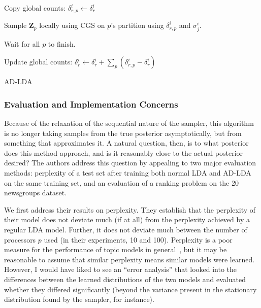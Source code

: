 \documentclass[11pt]{article}
\begin{document}
\begin{algorithm}
  \begin{algorithmic}
    \Repeat

        Copy global counts: $\delta_{r,p}^i \leftarrow \delta_r^i$

        Sample $\mathbf{Z}_p$ locally using CGS on $p$'s partition using
        $\delta_{r,p}^i$ and $\sigma_j^i$.
      \EndFor

      Wait for all $p$ to finish.

      Update global counts: $\delta_r^i \leftarrow \delta_r^i + \sum_p
      (\delta_{r,p}^i - \delta_r^i)$
  \end{algorithmic}
  \caption{AD-LDA}
  \label{alg:adlda}
\end{algorithm}

\subsubsection{Evaluation and Implementation Concerns}

Because of the relaxation of the sequential nature of the sampler, this
algorithm is no longer taking samples from the true posterior
asymptotically, but from something that approximates it. A natural
question, then, is to what posterior does this method approach, and is it
reasonably close to the actual posterior desired? The authors address this
question by appealing to two major evaluation methods: perplexity of a test
set after training both normal LDA and AD-LDA on the same training set, and
an evaluation of a ranking problem on the 20 newsgroups dataset.

We first address their results on perplexity. They establish that the
perplexity of their model does not deviate much (if at all) from the
perplexity achieved by a regular LDA model. Further, it does not deviate
much between the number of processors $p$ used (in their experiments, 10
and 100). Perplexity is a poor measure for the performance of topic models
in general~\cite{Chang:2009:tealeaves}, but it may be reasonable to assume
that similar perplexity means similar models were learned. However, I would
have liked to see an ``error analysis'' that looked into the differences
between the learned distributions of the two models and evaluated whether
they differed significantly (beyond the variance present in the stationary
distribution found by the sampler, for instance).
\end{document}
